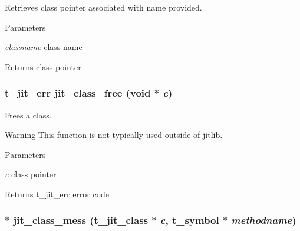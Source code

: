 Retrieves class pointer associated with name provided. 
\begin{DoxyParams}{Parameters}
\item[{\em classname}]class name\end{DoxyParams}
\begin{DoxyReturn}{Returns}
class pointer 
\end{DoxyReturn}
\hypertarget{group__classmod_ga2847462538894f23ae00b8265232db09}{
\subsubsection[{jit\_\-class\_\-free}]{\setlength{\rightskip}{0pt plus 5cm}t\_\-jit\_\-err jit\_\-class\_\-free (void $\ast$ {\em c})}}
\label{group__classmod_ga2847462538894f23ae00b8265232db09}


Frees a class. \begin{DoxyWarning}{Warning}
This function is not typically used outside of jitlib.
\end{DoxyWarning}

\begin{DoxyParams}{Parameters}
\item[{\em c}]class pointer\end{DoxyParams}
\begin{DoxyReturn}{Returns}
t\_\-jit\_\-err error code 
\end{DoxyReturn}
\hypertarget{group__classmod_gaa786dc731a24864a74f94e9b19aabdba}{
\subsubsection[{jit\_\-class\_\-mess}]{$\ast$ jit\_\-class\_\-mess ({\bf t\_\-jit\_\-class} $\ast$ {\em c}, \/  {\bf t\_\-symbol} $\ast$ {\em methodname})}}
\label{group__classmod_gaa786dc731a24864a74f94e9b19aabdba}



